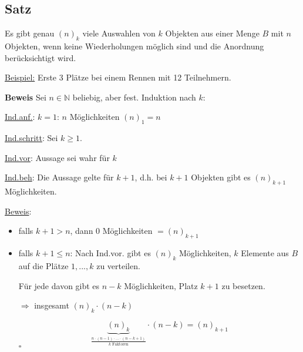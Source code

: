 \documentclass[a4paper, 12pt, twoside] {article}
\begin{document}
\subsection{Satz} %

Es gibt genau $(n)_k$ viele Auswahlen von $k$ Objekten aus einer Menge $B$ mit $n$ Objekten, wenn keine Wiederholungen möglich sind und die Anordnung berücksichtigt wird.

\uline{Beispiel:} Erste 3 Plätze bei einem Rennen mit 12 Teilnehmern.



\textbf{Beweis} Sei $n \in \mathbb{N}$ beliebig, aber fest. Induktion nach $k$:

\uline{Ind.anf.}: $k=1$: $n$ Möglichkeiten $(n)_1 = n$ \checkmark

\uline{Ind.schritt}: Sei $k \geq 1$.

\uline{Ind.vor}: Aussage sei wahr für $k$

\uline{Ind.beh}: Die Aussage gelte für $k+1$, d.h. bei $k+1$ Objekten gibt es $(n)_{k+1}$ Möglichkeiten.

\uline{Beweis}:

\begin{itemize}

\item falls $k+1 > n$, dann $0$ Möglichkeiten $= (n)_{k+1}$

\item falls $k+1 \leq n$: Nach Ind.vor. gibt es $(n)_k$ Möglichkeiten, $k$ Elemente aus $B$ auf die Plätze $1, ... ,k$ zu verteilen.

Für jede davon gibt es $n-k$ Möglichkeiten, Platz $k+1$ zu besetzen.

$\Rightarrow$ insgesamt $(n)_k \cdot (n-k)$

$$\underbrace{(n)_k}_{\frac{n \cdot (n-1) \cdot ... \cdot (n-k+1)}{k \text{ Faktoren}}} \cdot (n-k) = (n)_{k+1}$$
\hfill $\square$

\end{itemize}
\end{document}
